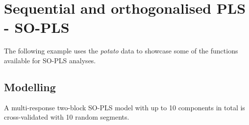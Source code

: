 \documentclass[
]{article}
\begin{document}
\hypertarget{sequential-and-orthogonalised-pls---so-pls}{%
\section{Sequential and orthogonalised PLS -
SO-PLS}\label{sequential-and-orthogonalised-pls---so-pls}}

The following example uses the \emph{potato} data to showcase some of
the functions available for SO-PLS analyses.

\hypertarget{modelling-2}{%
\subsection{Modelling}\label{modelling-2}}

A multi-response two-block SO-PLS model with up to 10 components in
total is cross-validated with 10 random segments.
\end{document}
